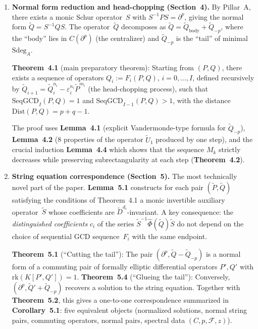 \documentclass[12pt,a4paper]{article}
\theoremstyle{definition}
\begin{document}
\begin{enumerate}[label=\textbf{Step \arabic*.}, leftmargin=*]
\item \textbf{Normal form reduction and head-chopping (Section~4).}
  By Pillar~A, there exists a monic Schur operator~$S$ with
  $S^{-1}PS = \partial^p$, giving the normal form $\widetilde{Q} =
  S^{-1}QS$.  The operator~$\widetilde{Q}$ decomposes as
  $\widetilde{Q} = \widetilde{Q}_{\text{body}} +
  \widetilde{Q}_{-p}$, where the ``body'' lies in
  $C(\partial^p)$ (the centralizer) and
  $\widetilde{Q}_{-p}$ is the ``tail'' of minimal $\mathrm{Sdeg}_A$.

  \textbf{Theorem~4.1} (main preparatory theorem): Starting from
  $(P,Q)$, there exists a sequence of operators
  $Q_i := F_i(P,Q)$, $i = 0,\ldots,I$, defined recursively by
  $\widetilde{Q}_{i+1} = \widetilde{Q}_i^{n_i} -
  \varepsilon_i^{n_i}\widetilde{P}^{m_i}$ (the head-chopping
  process), such that
  $\mathrm{SeqGCD}_I(P,Q) = 1$ and
  $\mathrm{SeqGCD}_{I-1}(P,Q) > 1$,
  with the distance
  $\mathrm{Dist}(P,Q) = p + q - 1$.

  The proof uses \textbf{Lemma~4.1} (explicit Vandermonde-type
  formula for $\widetilde{Q}_{-p}$), \textbf{Lemma~4.2} (8
  properties of the operator $\widetilde{U}_1$ produced by one step),
  and the crucial induction \textbf{Lemma~4.4} which shows that the
  sequence $M_k$ strictly decreases while preserving subrectangularity
  at each step (\textbf{Theorem~4.2}).

\item \textbf{String equation correspondence (Section~5).}
  The most technically novel part of the paper.  \textbf{Lemma~5.1}
  constructs for each pair $(\widetilde{P},\widetilde{Q})$ satisfying
  the conditions of Theorem~4.1 a monic invertible auxiliary
  operator~$\widetilde{S}$ whose coefficients are
  $\widetilde{D}^{d_i}$-invariant.  A key consequence: the
  \emph{distinguished coefficients} $c_i$ of the series
  $\widetilde{S}^{-1}\hat{\Phi}(\widetilde{Q})\widetilde{S}$
  do not depend on the choice of sequential GCD sequence~$F_i$ with
  the same endpoint.

  \textbf{Theorem~5.1} (``Cutting the tail''): The pair
  $(\partial^p, \widetilde{Q} - \widetilde{Q}_{-p})$ is a normal
  form of a commuting pair of formally elliptic differential operators
  $P', Q'$ with $\mathrm{rk}(K[P',Q']) = 1$.
  \textbf{Theorem~5.4} (``Glueing the tail''): Conversely,
  $(\partial^p, \widetilde{Q}' + \widetilde{Q}_{-p})$ recovers
  a solution to the string equation.  Together with
  \textbf{Theorem~5.2}, this gives a one-to-one correspondence
  summarized in \textbf{Corollary~5.1}: five equivalent objects
  (normalized solutions, normal string pairs, commuting operators,
  normal pairs, spectral data $(C,p,\mathcal{F},z)$).


\end{enumerate}
\end{document}
